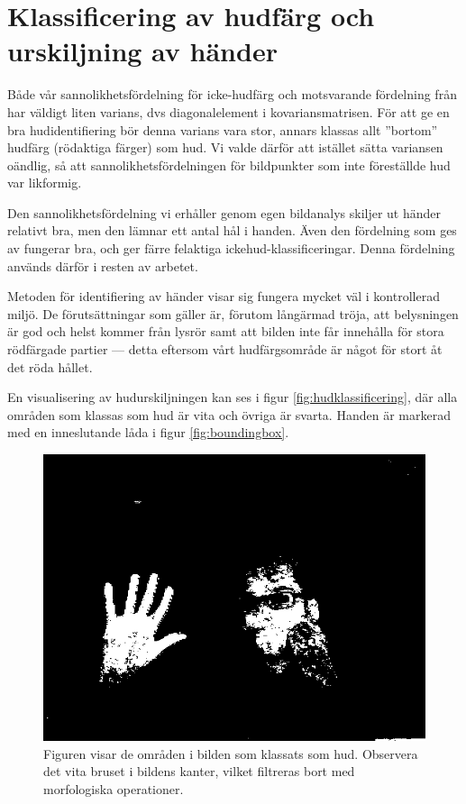 \documentclass[../rapport_MVEX01-11-05]{subfiles}
\begin{document}
\section{Klassificering av hudfärg och urskiljning av händer}
Både vår sannolikhetsfördelning för icke-hudfärg och motsvarande
fördelning från  har väldigt liten varians,
dvs diagonalelement i kovariansmatrisen. För att ge en bra
hudidentifiering bör denna varians vara stor, annars klassas allt
''bortom'' hudfärg (rödaktiga färger) som hud. Vi valde därför att
istället sätta variansen oändlig, så att sannolikhetsfördelningen för
bildpunkter som inte föreställde hud var likformig.

Den sannolikhetsfördelning vi erhåller genom egen bildanalys skiljer
ut händer relativt bra, men den lämnar ett antal hål i handen. Även
den fördelning som ges av  fungerar bra, och
ger färre felaktiga ickehud-klassificeringar.
Denna fördelning används därför
i resten av arbetet. 

Metoden för identifiering av händer visar sig fungera mycket väl i
kontrollerad miljö. De förutsättningar som gäller är, förutom långärmad
tröja, att belysningen är god och helst kommer från lysrör
samt att bilden inte får innehålla för stora rödfärgade partier --- detta
eftersom vårt hudfärgsområde är något för stort åt det röda hållet. 

En visualisering av hudurskiljningen kan ses i figur
\vref{fig:hudklassificering}, där alla områden som klassas som hud
är vita och övriga är svarta. Handen är markerad med en inneslutande
låda i figur \vref{fig:boundingbox}.

\begin{figure}
  \centering
  \includegraphics[width=0.9\columnwidth]{bilder/whiteskin}
  \caption{Figuren visar de områden i bilden som klassats som hud.
  Observera det vita bruset i bildens kanter, vilket filtreras bort med
  morfologiska operationer.}
  \label{fig:hudklassificering}
\end{figure}
\end{document}
